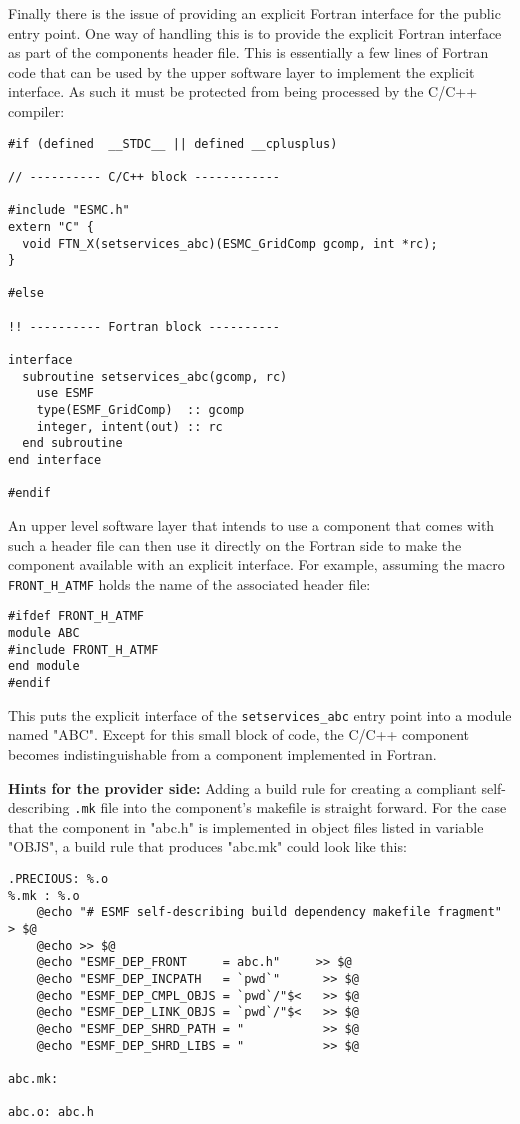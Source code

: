 Finally there is the issue of providing an explicit Fortran interface for the public entry point. One way of handling this is to provide the explicit Fortran interface as part of the components header file. This is essentially a few lines of Fortran code that can be used by the upper software layer to implement the explicit interface. As such it must be protected from being processed by the C/C++ compiler:

\begin{verbatim}
#if (defined  __STDC__ || defined __cplusplus)

// ---------- C/C++ block ------------

#include "ESMC.h"
extern "C" {
  void FTN_X(setservices_abc)(ESMC_GridComp gcomp, int *rc);
}

#else

!! ---------- Fortran block ----------

interface
  subroutine setservices_abc(gcomp, rc)
    use ESMF
    type(ESMF_GridComp)  :: gcomp
    integer, intent(out) :: rc
  end subroutine
end interface

#endif
\end{verbatim}

An upper level software layer that intends to use a component that comes with such a header file can then use it directly on the Fortran side to make the component available with an explicit interface. For example, assuming the macro {\tt FRONT\_H\_ATMF} holds the name of the associated header file:

\begin{verbatim}
#ifdef FRONT_H_ATMF
module ABC
#include FRONT_H_ATMF
end module
#endif
\end{verbatim}

This puts the explicit interface of the {\tt setservices\_abc} entry point into a module named "ABC". Except for this small block of code, the C/C++ component becomes indistinguishable from a component implemented in Fortran.

{\bf Hints for the provider side:} Adding a build rule for creating a compliant self-describing {\tt .mk} file into the component's makefile is straight forward. For the case that the component in "abc.h" is implemented in object files listed in variable "OBJS", a build rule that produces "abc.mk" could look like this:

\begin{verbatim}
.PRECIOUS: %.o
%.mk : %.o
	@echo "# ESMF self-describing build dependency makefile fragment" > $@
	@echo >> $@
	@echo "ESMF_DEP_FRONT     = abc.h"     >> $@
	@echo "ESMF_DEP_INCPATH   = `pwd`"      >> $@
	@echo "ESMF_DEP_CMPL_OBJS = `pwd`/"$<   >> $@
	@echo "ESMF_DEP_LINK_OBJS = `pwd`/"$<   >> $@
	@echo "ESMF_DEP_SHRD_PATH = "           >> $@
	@echo "ESMF_DEP_SHRD_LIBS = "           >> $@

abc.mk:

abc.o: abc.h

\end{verbatim}

